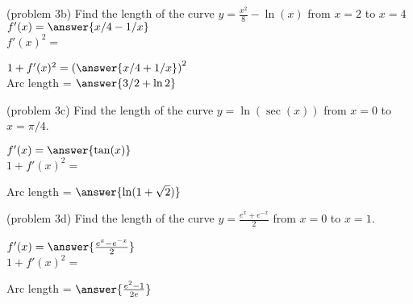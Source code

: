 \documentclass{ximera}
\begin{document}
\begin{problem}(problem 3b)
Find the length of the curve $\displaystyle{y = \frac{x^2}{8} - \ln(x)}$ from $x = 2$ to $x = 4$\\

$f'(x) = \answer{x/4 - 1/x}$\\

$f'(x)^2 =$

\begin{multipleChoice}
\end{multipleChoice}

$1+f'(x)^2 = \left(\answer{x/4 + 1/x}\right)^2$\\

Arc length = $\answer{3/2 + \ln 2}$
\end{problem}


\begin{problem}(problem 3c)
Find the length of the curve $y = \ln(\sec(x))$ from $x = 0$ to $x = \pi/4$.

$f'(x) = \answer{\tan(x)}$\\

$1 + f'(x)^2 =$

\begin{multipleChoice}
\end{multipleChoice}


Arc length = $\answer{\ln(1 + \sqrt 2)}$
\end{problem}



\begin{problem}(problem 3d)
Find the length of the curve $y = \frac{e^x + e^{-x}}{2}$ from $x = 0$ to $x = 1$.

$f'(x) = \answer{\frac{e^x - e^{-x}}{2}}$\\

$1 + f'(x)^2 =$

\begin{multipleChoice}
\end{multipleChoice}


Arc length = $\answer{\frac{e^2 - 1}{2e}}$
\end{problem}
\end{document}
